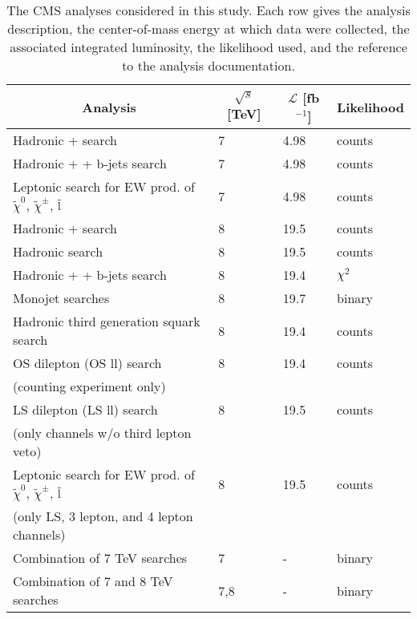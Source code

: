 \begin{table}[htb]
\caption{The CMS analyses considered in this study.  Each row gives the analysis description, the center-of-mass energy at which data were collected,
  the associated integrated luminosity,
  the likelihood used,
  and the reference to the analysis documentation.
  }
\begin{center}
\begin{tabular}{l|l|l|l}
\hline
\multicolumn{1}{c|}{Analysis} & \multicolumn{1}{|c|}{$\sqrt{s}$ [TeV]} & \multicolumn{1}{|c|}{$\mathcal{L}$ [fb$^{-1}$]} & \multicolumn{1}{|c}{Likelihood} \\
\hline
Hadronic \HT{} + \MHT{} search \cite{SUS12011} & 7  & 4.98 & counts \\
Hadronic \HT{} + \MET{} + b-jets search  \cite{SUS12003} & 7  & 4.98 & counts\\
Leptonic search for EW prod. of $\widetilde{\chi}^0$,
$\widetilde{\chi}^{\pm}$, $\tilde{\rm l}$ \cite{SUS12006} & 7  & 4.98 & counts \\
\hline
Hadronic \HT{} + \MHT{} search \cite{SUS13012} & 8  & 19.5 & counts\\
Hadronic \MTtwo{} search \cite{Chatrchyan:2012jx} & 8 & 19.5 & counts\\
Hadronic \HT{} + \MET{} + b-jets search \cite{SUS12024} & 8 & 19.4 & $\chi^2$\\
Monojet searches \cite{Khachatryan:2014rra} & 8  & 19.7 & binary\\
Hadronic third generation squark search \cite{Khachatryan:2015wza}  & 8 & 19.4 & counts\\
OS dilepton (OS ll) search \cite{Khachatryan:2015lwa} & 8 & 19.4 & counts\\
(counting experiment only) & & & \\
LS dilepton (LS ll) search \cite{SUS13013} & 8 & 19.5 & counts\\
(only channels w/o third lepton veto)& & & \\
Leptonic search for EW prod. of $\widetilde\chi^0$,
$\widetilde{\chi}^{\pm}$, $\tilde{\rm l}$ \cite{SUS13006} & 8 & 19.5 & counts\\
(only LS, 3 lepton, and 4 lepton channels)& & &\\
\hline
Combination of 7 TeV searches & 7 & - & binary  \\
Combination of 7 and 8 TeV searches & 7,8 & - & binary  \\
\hline
\end{tabular}
\label{tab:CMS}
\end{center}
\end{table}
